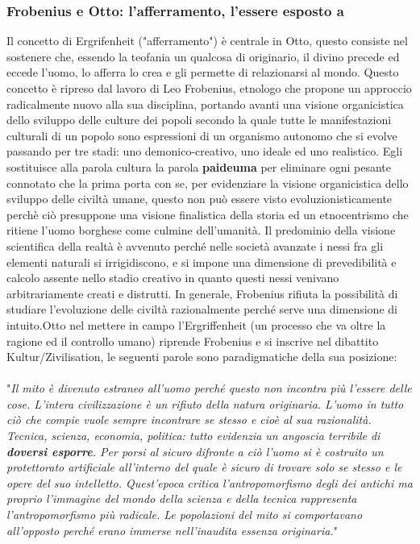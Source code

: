 \documentclass[10pt,a4paper]{article}
\begin{document}
\subsubsection{Frobenius e Otto: l'afferramento, l'essere esposto a}
Il concetto di Ergrifenheit ("afferramento") è centrale in Otto, questo consiste nel sostenere che, essendo la teofania un qualcosa di originario, il divino precede ed eccede l'uomo, lo afferra lo crea e gli permette di relazionarsi al mondo. Questo concetto è ripreso dal lavoro di Leo Frobenius, etnologo che propone un approccio radicalmente nuovo alla sua disciplina, portando avanti una visione organicistica dello sviluppo delle culture dei popoli secondo la quale tutte le manifestazioni culturali di un popolo sono espressioni di un organismo autonomo che si evolve passando per tre stadi: uno demonico-creativo, uno ideale ed uno realistico. Egli sostituisce alla parola cultura la parola \textbf{paideuma} per eliminare ogni pesante connotato che la prima porta con se, per evidenziare la visione organicistica dello sviluppo delle civiltà umane, questo non può essere visto evoluzionisticamente perchè ciò presuppone una visione finalistica della storia ed un etnocentrismo che ritiene l'uomo borghese come culmine dell'umanità. Il predominio della visione scientifica della realtà è avvenuto perché nelle società avanzate i nessi fra gli elementi naturali si irrigidiscono, e si impone una dimensione di prevedibilità e calcolo assente nello stadio creativo in quanto questi nessi venivano arbitrariamente creati e distrutti. In generale, Frobenius rifiuta la possibilità di studiare l'evoluzione delle civiltà razionalmente perché serve una dimensione di intuito.Otto nel mettere in campo l'Ergriffenheit (un processo che va oltre la ragione ed il controllo umano) riprende Frobenius e si inscrive nel dibattito Kultur/Zivilisation, le seguenti parole sono paradigmatiche della sua posizione:\\\\
 "\textit{Il mito è divenuto estraneo all'uomo perché questo non incontra più l'essere delle cose. L'intera civilizzazione è un rifiuto della natura originaria. L'uomo in tutto ciò che compie vuole sempre incontrare se stesso e cioè al sua razionalità. Tecnica, scienza, economia, politica: tutto evidenzia un angoscia terribile di \textbf{doversi esporre}. Per porsi al sicuro difronte a ciò l'uomo si è costruito un protettorato artificiale all'interno del quale è sicuro di trovare solo se stesso e le opere del suo intelletto. Quest'epoca critica l'antropomorfismo degli dei antichi ma proprio l'immagine del mondo della scienza e della tecnica rappresenta l'antropomorfismo più radicale. Le popolazioni del mito si comportavano all'opposto perché erano immerse nell'inaudita essenza originaria.}"\\\\
\end{document}
